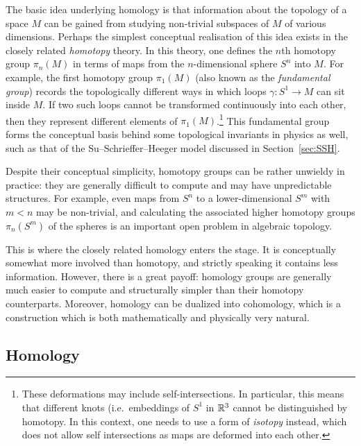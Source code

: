 The basic idea underlying homology is that information about the topology of a space $M$ can be gained from studying non-trivial subspaces of $M$ of various dimensions. Perhaps the simplest conceptual realisation of this idea exists in the closely related \emph{homotopy} theory. In this theory, one defines the $n$th homotopy group $\pi_n(M)$ in terms of maps from the $n$-dimensional sphere $S^n$ into $M$. For example, the first homotopy group $\pi_1(M)$ (also known as the \emph{fundamental group}) records the topologically different ways in which loops $\gamma:S^1\to M$ can sit inside $M$. If two such loops cannot be transformed continuously into each other, then they represent different elements of $\pi_1(M)$.\footnote{
	These deformations may include self-intersections. In particular, this means that different knots (i.e.\ embeddings of $S^1$ in $\mathbb{R}^3$ cannot be distinguished by homotopy. In this context, one needs to use a form of \emph{isotopy} instead, which does not allow self intersections as maps are deformed into each other.}
This fundamental group forms the conceptual basis behind some topological invariants in physics as well, such as that of the Su--Schrieffer--Heeger model discussed in Section~\ref{sec:SSH}.

Despite their conceptual simplicity, homotopy groups can be rather unwieldy in practice: they are generally difficult to compute and may have unpredictable structures. For example, even maps from $S^n$ to a lower-dimensional $S^m$ with $m<n$ may be non-trivial, and calculating the associated higher homotopy groups $\pi_n(S^m)$ of the spheres is an important open problem in algebraic topology.

This is where the closely related homology enters the stage. It is conceptually somewhat more involved than homotopy, and strictly speaking it contains less information. However, there is a great payoff: homology groups are generally much easier to compute and structurally simpler than their homotopy counterparts. Moreover, homology can be dualized into cohomology, which is a construction which is both mathematically and physically very natural.


\subsection{Homology}

